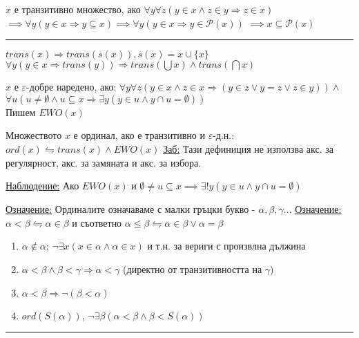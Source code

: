 \documentclass[fleqn, titlepage, 12pt]{report}
\begin{document}
 $ x $ е транзитивно множество, ако $ \forall{y} \forall{z} (y \in x \land z \in y \Rightarrow z \in x) $
$ \implies \forall{y}(y \in x \Rightarrow y \subseteq x)  \implies \forall{y}(y \in x \Rightarrow y \in \mathcal{P}(x)) $
$ \implies x \subseteq \mathcal{P}(x) $

\bigbreak
\hrule
\bigbreak

$ trans(x) \Rightarrow trans(s(x)), s(x) = x \cup \{ x \}  $\\
$ \forall{y}(y \in x \Rightarrow trans(y)) \Rightarrow trans(\bigcup x) \land trans(\bigcap x) $
\bigbreak

 $ x $ е $ \varepsilon $-добре наредено, ако:
$ \forall{y}\forall{z}(y \in x \land z \in x \Rightarrow (y \in z \lor y = z \lor z \in y)) \land $\\
$ \forall{u}(u \neq \emptyset \land u \subseteq x \Rightarrow \exists{y}(y \in u \land y \cap u = \emptyset)) $\\
Пишем $ EWO(x) $
\bigbreak

 Множеството $ x $ е ординал, ако е транзитивно и $ \varepsilon $-д.н.:
$ ord(x) \leftrightharpoons trans(x) \land EWO(x) $
\bigbreak
\underline{Заб:} Тази дефиниция не използва акс. за регулярност, акс. за замяната и акс. за избора.
\bigbreak

\underline{Наблюдение:} Ако $ EWO(x) $ и
$ \emptyset \neq u \subseteq x \implies \exists{!y}(y \in u \land y \cap u = \emptyset)$
\bigbreak

\underline{Означение:} Ординалите означаваме с малки гръцки букво - $ \alpha, \beta, \gamma ... $
\bigbreak
\underline{Означение:} $ \alpha < \beta \leftrightharpoons \alpha \in \beta $ и съответно
 $ \alpha \leq \beta \leftrightharpoons \alpha \in \beta \lor \alpha = \beta$
\bigbreak

\begin{enumerate}
  \item $ \alpha \notin \alpha $; $ \lnot \exists{x}(x \in \alpha \land \alpha \in x) $
    и т.н. за вериги с произвлна дължина
  \item $ \alpha < \beta \land \beta < \gamma \Rightarrow \alpha < \gamma $ (директно от транзитивността на $ \gamma $)
  \item $ \alpha < \beta \Rightarrow \lnot(\beta < \alpha) $
  \item $ ord(S(\alpha)) $, $ \lnot \exists{\beta}(\alpha < \beta \land \beta < S(\alpha)) $
\end{enumerate}

\bigbreak
\hrule
\bigbreak
\end{document}
